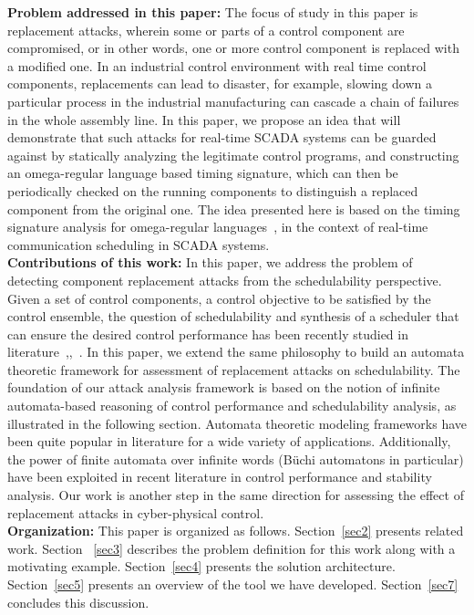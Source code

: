 \noindent
{\bf Problem addressed in this paper:} The focus of study in this paper is replacement attacks, wherein some or parts of a control component 
are compromised, or in other words, one or more control component is replaced with a modified one.  In an industrial control environment with real time control components, replacements can lead to disaster, for example, slowing down a
particular process in the industrial manufacturing can cascade a chain of failures in the whole
assembly line. In this paper, we propose an idea that will demonstrate that such
attacks for real-time SCADA systems can be guarded against by statically analyzing the
legitimate control programs, and constructing an omega-regular language based timing signature,
which can then be periodically checked on the running components to distinguish a replaced
component from the original one. The idea presented here is based on the timing signature analysis for omega-regular languages~\cite{WeissFAA09}, in the context of real-time communication scheduling
in SCADA systems. \\

\noindent
{\bf Contributions of this work:}
In this paper, we address the problem of detecting component replacement attacks from the schedulability perspective. Given a set of control components, a control objective 
to be satisfied by the control ensemble, the question of schedulability and 
synthesis of a scheduler that can ensure the desired control performance has been recently studied in literature~\cite{WeissFAA09},\cite{AlurW08},~\cite{GhoshMDHD16}. 
In this paper, we extend the same philosophy to build an automata theoretic framework for assessment of replacement attacks on schedulability. The foundation of our attack analysis framework is based on the notion of infinite automata-based reasoning of control performance and schedulability analysis, as illustrated in the following section. Automata theoretic modeling frameworks have been quite popular in literature for a wide variety of applications. Additionally, the power of finite automata over infinite words (B\"{u}chi automatons in particular) have been exploited in recent literature in control performance and stability analysis. Our work is another step in the same direction for assessing the effect of replacement attacks in cyber-physical control. \\


\noindent
{\bf Organization:} This paper is organized as follows. Section~\ref{sec2} presents related work. Section ~\ref{sec3} describes the problem definition for this work along with a motivating example. Section~\ref{sec4} presents the solution architecture. Section~\ref{sec5} presents an overview of the tool we have developed. Section~\ref{sec7} concludes this discussion.
